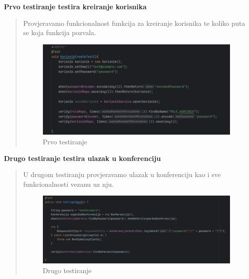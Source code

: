 			\begin{packed_enum}
				\item\textbf{Prvo testiranje testira kreiranje korisnika}
				
				\begin{quote}
						Provjeravamo funkcionalnost funkcija za kreiranje korisnika te koliko puta se koja funkcija pozvala.
						\begin{figure}[H]
							\includegraphics[width=\textwidth]{slike/JUnit1.png} %
							\caption{Prvo testiranje}
							\label{fig:JUnit1} %
						\end{figure}
				\end{quote}
				
				
				\item\textbf{Drugo testiranje testira ulazak u konferenciju}
				
				\begin{quote}
					U drugom testiranju provjeravamo ulazak u konferenciju kao i sve funkcionalnosti vezanu uz nju.
					\begin{figure}[H]
						\includegraphics[width=\textwidth]{slike/JUnit2.png} %
						\caption{Drugo testiranje}
						\label{fig:JUnit2} %
					\end{figure}
				\end{quote}
				

\end{packed_enum}
